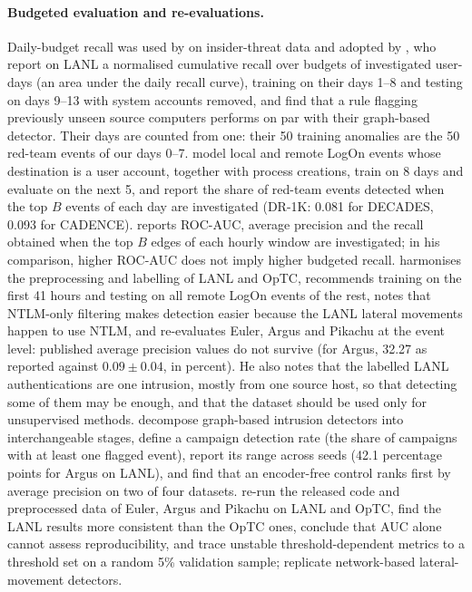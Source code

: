 \documentclass[11pt,a4paper]{article}
\begin{document}
\paragraph{Budgeted evaluation and re-evaluations.}
Daily-budget recall was used by \textcite{tuor2017} on insider-threat data and adopted by \textcite{garchery2020adsage}, who report on LANL a normalised cumulative recall over budgets of investigated user-days (an area under the daily recall curve), training on their days 1--8 and testing on days 9--13 with system accounts removed, and find that a rule flagging previously unseen source computers performs on par with their graph-based detector. Their days are counted from one: their 50 training anomalies are the 50 red-team events of our days 0--7. \textcite{larroche2021decades} model local and remote LogOn events whose destination is a user account, together with process creations, train on 8 days and evaluate on the next 5, and report the share of red-team events detected when the top $B$ events of each day are investigated (DR-1K: 0.081 for DECADES, 0.093 for CADENCE). \textcite{larroche2025ultralmd} reports ROC-AUC, average precision and the recall obtained when the top $B$ edges of each hourly window are investigated; in his comparison, higher ROC-AUC does not imply higher budgeted recall. \textcite{larroche2026fair} harmonises the preprocessing and labelling of LANL and OpTC, recommends training on the first 41 hours and testing on all remote LogOn events of the rest, notes that NTLM-only filtering makes detection easier because the LANL lateral movements happen to use NTLM, and re-evaluates Euler, Argus and Pikachu at the event level: published average precision values do not survive (for Argus, 32.27 as reported against $0.09 \pm 0.04$, in percent). He also notes that the labelled LANL authentications are one intrusion, mostly from one source host, so that detecting some of them may be enough, and that the dataset should be used only for unsupervised methods. \textcite{zhao2026gids} decompose graph-based intrusion detectors into interchangeable stages, define a campaign detection rate (the share of campaigns with at least one flagged event), report its range across seeds (42.1 percentage points for Argus on LANL), and find that an encoder-free control ranks first by average precision on two of four datasets. \textcite{wang2025rr} re-run the released code and preprocessed data of Euler, Argus and Pikachu on LANL and OpTC, find the LANL results more consistent than the OpTC ones, conclude that AUC alone cannot assess reproducibility, and trace unstable threshold-dependent metrics to a threshold set on a random 5\% validation sample; \textcite{boucek2025replication} replicate network-based lateral-movement detectors.
\end{document}
